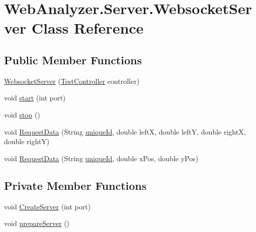 \hypertarget{class_web_analyzer_1_1_server_1_1_websocket_server}{}\section{Web\+Analyzer.\+Server.\+Websocket\+Server Class Reference}
\label{class_web_analyzer_1_1_server_1_1_websocket_server}
\subsection*{Public Member Functions}
\begin{DoxyCompactItemize}
\item 
\hyperlink{class_web_analyzer_1_1_server_1_1_websocket_server_a3fddc08875cc188f4fb799ca4ccfe6ad}{Websocket\+Server} (\hyperlink{class_web_analyzer_1_1_controller_1_1_test_controller}{Test\+Controller} controller)
\item 
void \hyperlink{class_web_analyzer_1_1_server_1_1_websocket_server_ae006161a22122f220e0788cf8894cfb6}{start} (int port)
\item 
void \hyperlink{class_web_analyzer_1_1_server_1_1_websocket_server_a2c5391b6ebe427d2d42d7b601b922e5b}{stop} ()
\item 
void \hyperlink{class_web_analyzer_1_1_server_1_1_websocket_server_acab32c7df617492c47da886956332d9f}{Request\+Data} (String \hyperlink{_u_i_2_h_t_m_l_resources_2js_2lib_2underscore_8min_8js_af690ff5521d79c7128861033ae80ae17}{unique\+Id}, double left\+X, double left\+Y, double right\+X, double right\+Y)
\item 
void \hyperlink{class_web_analyzer_1_1_server_1_1_websocket_server_aa0ffcc2e38d0a5c7f85e6c50b283718a}{Request\+Data} (String \hyperlink{_u_i_2_h_t_m_l_resources_2js_2lib_2underscore_8min_8js_af690ff5521d79c7128861033ae80ae17}{unique\+Id}, double x\+Pos, double y\+Pos)
\end{DoxyCompactItemize}
\subsection*{Private Member Functions}
\begin{DoxyCompactItemize}
\item 
void \hyperlink{class_web_analyzer_1_1_server_1_1_websocket_server_a6bd50680516243f710b7eb189241b256}{Create\+Server} (int port)
\item 
void \hyperlink{class_web_analyzer_1_1_server_1_1_websocket_server_ad36bdf3fe5b0a9df1c652b67e504561c}{prepare\+Server} ()
\end{DoxyCompactItemize}
